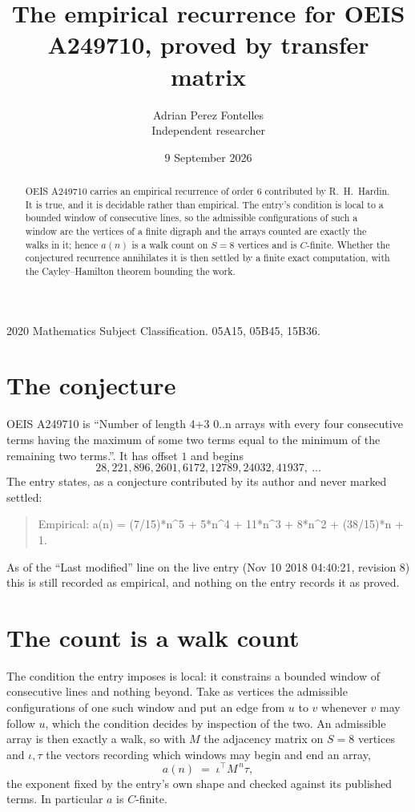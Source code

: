 \documentclass[11pt,a4paper]{article}
\title{The empirical recurrence for OEIS A249710, proved by transfer matrix}
\author{Adrian Perez Fontelles\\ \small Independent researcher}
\date{9 September 2026}
\theoremstyle{plain}
\theoremstyle{definition}
\begin{document}
\maketitle

\begin{abstract}
OEIS A249710 carries an empirical recurrence of order $6$ contributed by R.~H.~Hardin. It is
true, and it is decidable rather than empirical. The entry's condition is local to a bounded window of consecutive lines, so
the admissible configurations of such a window are the vertices of a finite digraph and the
arrays counted are exactly the walks in it; hence $a(n)$ is a walk count on $S=8$ vertices
and is $C$-finite. Whether the conjectured recurrence annihilates it is then settled by a
finite exact computation, with the Cayley--Hamilton theorem bounding the work.
\end{abstract}

\noindent\small 2020 Mathematics Subject Classification. 05A15, 05B45, 15B36.\normalsize

\section{The conjecture}

OEIS A249710 is ``Number of length 4+3 0..n arrays with every four consecutive terms having the maximum of some two terms equal to the minimum of the remaining two terms.''. It has offset $1$ and begins
\[
28, 221, 896, 2601, 6172, 12789, 24032, 41937,\ \dots
\]
The entry states, as a conjecture contributed by its author and never marked settled:
\begin{quote}
Empirical: a(n) = (7/15)*n\^{}5 + 5*n\^{}4 + 11*n\^{}3 + 8*n\^{}2 + (38/15)*n + 1.
\end{quote}
As of the ``Last modified'' line on the live entry (Nov 10 2018 04:40:21, revision 8) this is still
recorded as empirical, and nothing on the entry records it as proved.

\section{The count is a walk count}

The condition the entry imposes is local: it constrains a bounded window of consecutive lines and nothing beyond. Take as
vertices the admissible configurations of one such window and put an edge from $u$ to $v$
whenever $v$ may follow $u$, which the condition decides by inspection of the two. An
admissible array is then exactly a walk, so with $M$ the adjacency matrix on $S=8$ vertices
and $\iota,\tau$ the vectors recording which windows may begin and end an array,
\[
a(n)\;=\;\iota^{\!\top}M^{\,n}\tau ,
\]
the exponent fixed by the entry's own shape and checked against its published terms. In
particular $a$ is $C$-finite.
\end{document}
